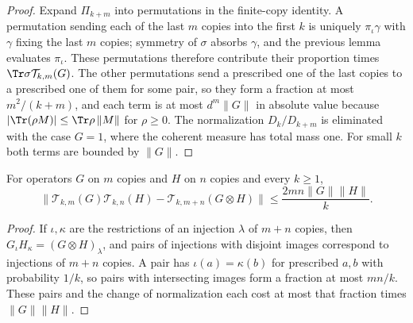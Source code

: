 \begin{proof}\leanok
    Expand $\Pi_{k+m}$ into permutations in the finite-copy identity. A permutation sending
    each of the last $m$ copies into the first $k$ is uniquely $\pi_\iota\gamma$ with
    $\gamma$ fixing the last $m$ copies; symmetry of $\sigma$ absorbs $\gamma$, and the
    previous lemma evaluates $\pi_\iota$. These permutations therefore contribute their
    proportion times $\Tr\sigma\mathcal T_{k,m}(G)$. The other permutations send a
    prescribed one of the last copies to a prescribed one of them for some pair, so they
    form a fraction at most $m^2/(k+m)$, and each term is at most $d^m\|G\|$ in absolute
    value because $|\Tr(\rho M)|\le\Tr\rho\,\|M\|$ for $\rho\ge0$. The normalization
    $D_k/D_{k+m}$ is eliminated with the case $G=1$, where the coherent measure has total
    mass one. For small $k$ both terms are bounded by $\|G\|$.
\end{proof}

\begin{theorem}
    \label{thm:injection_product}
    \leanok
    For operators $G$ on $m$ copies and $H$ on $n$ copies and every $k\ge1$,
    \[
        \|\mathcal T_{k,m}(G)\mathcal T_{k,n}(H)-\mathcal T_{k,m+n}(G\otimes H)\|
        \le\frac{2mn\|G\|\|H\|}{k}.
    \]
\end{theorem}

\begin{proof}\leanok
    If $\iota,\kappa$ are the restrictions of an injection $\lambda$ of $m+n$ copies, then
    $G_\iota H_\kappa=(G\otimes H)_\lambda$, and pairs of injections with disjoint images
    correspond to injections of $m+n$ copies. A pair has $\iota(a)=\kappa(b)$ for prescribed
    $a,b$ with probability $1/k$, so pairs with intersecting images form a fraction at most
    $mn/k$. These pairs and the change of normalization each cost at most that fraction
    times $\|G\|\|H\|$.
\end{proof}

